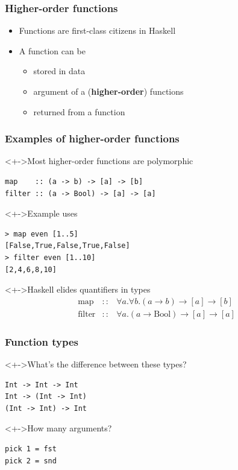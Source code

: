 \documentclass{beamer}
\subtitle{Higher-order functions}
\begin{document}
\begin{frame}
  \titlepage
\end{frame}
\begin{frame}[fragile]
  \frametitle{Higher-order functions}
  \begin{itemize}
  \item Functions are first-class citizens in Haskell
  \item A function can be
    \begin{itemize}
    \item stored in data
    \item argument of a (\textbf{higher-order}) functions
    \item returned from a function
    \end{itemize}
  \end{itemize}
\end{frame}
\begin{frame}[fragile]
  \frametitle{Examples of higher-order functions}

  \begin{block}<+->{Most higher-order functions are polymorphic}
\begin{verbatim}
map    :: (a -> b) -> [a] -> [b]
filter :: (a -> Bool) -> [a] -> [a]
\end{verbatim}
  \end{block}
  \begin{block}<+->{Example uses}
\begin{verbatim}
> map even [1..5]
[False,True,False,True,False]
> filter even [1..10]
[2,4,6,8,10]
\end{verbatim}
  \end{block}
  \begin{alertblock}<+->{Haskell elides quantifiers in types}
    \vspace{-\baselineskip}
    \begin{eqnarray*}
      \text{map} & :: & \forall a. \forall b. (a \to b) \to [a] \to [b] \\
      \text{filter} & :: & \forall a. (a \to \text{Bool}) \to [a] \to [a]
    \end{eqnarray*}
  \end{alertblock}
\end{frame}
\begin{frame}[fragile]
  \frametitle{Function types}
  \begin{block}<+->{What's the difference between these types?}
\begin{verbatim}
Int -> Int -> Int
Int -> (Int -> Int)
(Int -> Int) -> Int
\end{verbatim}
  \end{block}
  \begin{block}<+->{How many arguments?}
\begin{verbatim}
pick 1 = fst
pick 2 = snd
\end{verbatim}
  \end{block}  
\end{frame}
\end{document}
